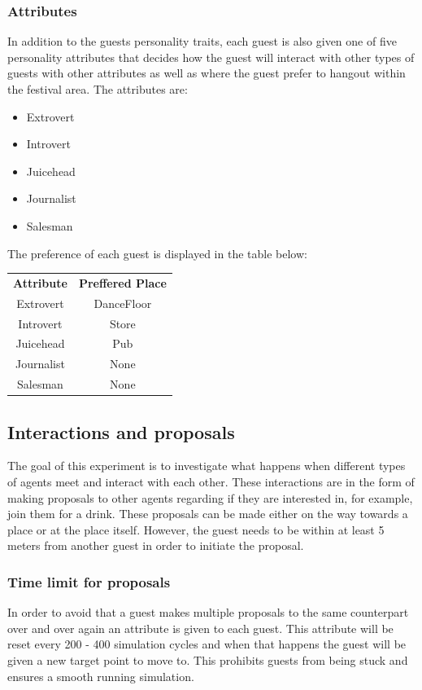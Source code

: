 \documentclass[a4paper,10pt]{article}
\begin{document}
\subsubsection{Attributes}
In addition to the guests personality traits, each guest is also given one of five personality attributes that decides how the guest will interact with other types of guests with other attributes as well as where the guest prefer to hangout within the festival area. The attributes are:

\begin{itemize}
    \item Extrovert
    \item Introvert
    \item Juicehead
    \item Journalist
    \item Salesman
\end{itemize}

The preference of each guest is displayed in the table below:

\begin{center}
\begin{tabular}{ |c|c| } 
 \hline
 \textbf{Attribute} & \textbf{Preffered Place} \\

 Extrovert & DanceFloor \\ 
 Introvert & Store  \\ 
 Juicehead & Pub  \\
 Journalist & None \\
 Salesman & None \\
 
 \hline
\end{tabular}
\end{center}

\subsection{Interactions and proposals}

The goal of this experiment is to investigate what happens when different types of agents meet and interact with each other. These interactions are in the form of making proposals to other agents regarding if they are interested in, for example, join them for a drink. These proposals can be made either on the way towards a place or at the place itself. However, the guest needs to be within at least 5 meters from another guest in order to initiate the proposal. 

\subsubsection{Time limit for proposals}
In order to avoid that a guest makes multiple proposals to the same counterpart over and over again an attribute is given to each guest. This attribute will be reset every 200 - 400 simulation cycles and when that happens the guest will be given a new target point to move to. This prohibits guests from being stuck and ensures a smooth running simulation. 
\end{document}
